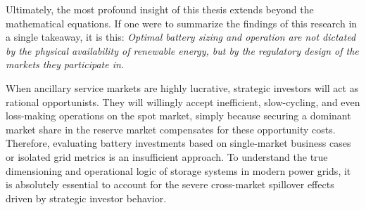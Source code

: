 Ultimately, the most profound insight of this thesis extends beyond the mathematical equations. If one were to summarize the findings of this research in a single takeaway, it is this: \textit{Optimal battery sizing and operation are not dictated by the physical availability of renewable energy, but by the regulatory design of the markets they participate in.} 

When ancillary service markets are highly lucrative, strategic investors will act as rational opportunists. They will willingly accept inefficient, slow-cycling, and even loss-making operations on the spot market, simply because securing a dominant market share in the reserve market compensates for these opportunity costs. Therefore, evaluating battery investments based on single-market business cases or isolated grid metrics is an insufficient approach. To understand the true dimensioning and operational logic of storage systems in modern power grids, it is absolutely essential to account for the severe cross-market spillover effects driven by strategic investor behavior.







